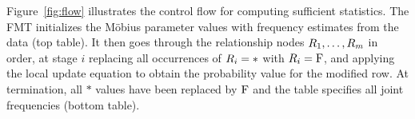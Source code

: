 \documentclass{article}
\begin{document}
Figure~\ref{fig:flow} illustrates the control flow for computing sufficient statistics.
The FMT initializes the M\"obius parameter values with frequency estimates from the data (top table).  
It then goes through the relationship nodes $R_{1},\ldots,R_{m}$ in order, at stage $i$ replacing all occurrences of $R_{i} = *$ with $R_{i} = \mathrm{F}$, and applying the local update equation to obtain the probability value for the modified row.
At termination, all $*$ values have been replaced by $\mathrm{F}$ and the table specifies all joint frequencies (bottom table). 


\end{document}

